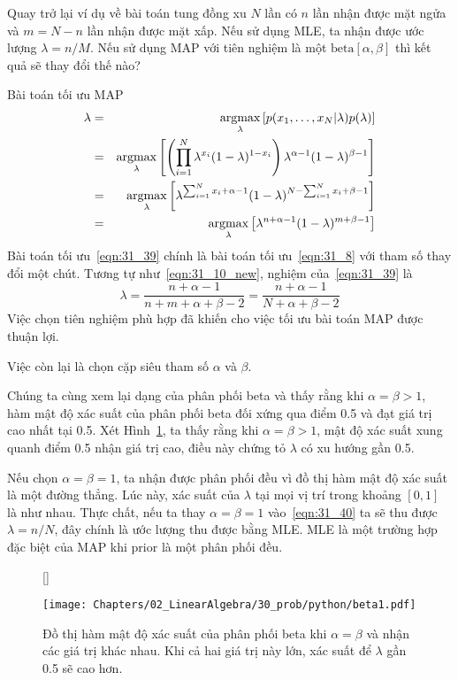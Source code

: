 Quay trở lại ví dụ về bài toán tung đồng xu $N$ lần có $n$ lần nhận được mặt
ngửa và $m = N - n$ lần nhận được mặt xấp. Nếu sử dụng MLE,
ta nhận được ước lượng $\lambda = n/M$. Nếu sử dụng MAP với tiên nghiệm là một
$\text{beta}[\alpha, \beta]$ thì kết quả sẽ thay đổi thế nào?

Bài toán tối ưu MAP
\begin{eqnarray}
\nonumber
\lambda & = & \operatorname*{argmax}_{\lambda} \left[p(x_1, \dots, x_N | \lambda) p(\lambda) \right] \\\
\nonumber
& = & \operatorname*{argmax}_{\lambda} \left[\left(\prod_{i=1}^N \lambda^{x_i} ( 1- \lambda)^{1 - x_i}\right) \lambda^{\alpha - 1} ( 1 - \lambda)^{\beta - 1} \right] \\\
\nonumber
& = & \operatorname*{argmax}_{\lambda} \left[ \lambda^{\sum_{i = 1}^N x_i + \alpha - 1} ( 1- \lambda)^{N - \sum_{i=1}^N x_i + \beta - 1} \right] \\\
\label{eqn:31_39}
& = & \operatorname*{argmax}_{\lambda} \left[ \lambda^{n + \alpha - 1} ( 1- \lambda)^{m + \beta - 1} \right]
\end{eqnarray}
Bài toán tối ưu~\eqref{eqn:31_39} chính là bài toán tối ưu~\eqref{eqn:31_8} với
tham số thay đổi một chút. Tương tự như~\eqref{eqn:31_10_new}, nghiệm
của~\eqref{eqn:31_39} là
\begin{equation}
\label{eqn:31_40}
\lambda = \frac{n + \alpha - 1}{n + m + \alpha + \beta - 2}= \frac{n + \alpha - 1}{N + \alpha + \beta - 2}
\end{equation}
Việc chọn tiên nghiệm phù hợp đã khiến cho việc tối ưu bài toán MAP được thuận
lợi.


Việc còn lại là chọn cặp siêu tham số $\alpha$ và $\beta$.

Chúng ta cùng xem lại dạng của phân phối beta và thấy rằng khi $\alpha
= \beta > 1$, hàm mật độ xác suất của phân phối beta đối xứng qua điểm 0.5 và
đạt giá trị cao nhất tại 0.5. Xét Hình~\ref{fig:31_1}, ta thấy rằng khi
$\alpha =\beta > 1$, mật độ xác suất xung quanh điểm 0.5 nhận giá trị
cao, điều này chứng tỏ $\lambda$ có xu hướng gần 0.5.

Nếu chọn $\alpha = \beta = 1$, ta nhận được phân phối đều vì đồ thị hàm mật
độ xác suất là một đường thẳng. Lúc này, xác suất của $\lambda$ tại mọi vị trí
trong khoảng $[0, 1]$ là như nhau. Thực chất, nếu ta thay $\alpha = \beta = 1$
vào~\eqref{eqn:31_40} ta sẽ thu được $\lambda = n/N$, đây chính là ước lượng thu
được bằng MLE. MLE là một trường hợp đặc biệt của MAP khi prior là một phân phối
đều.

\begin{figure}[t]
[\FBwidth]
{\caption{ Đồ thị hàm mật độ xác suất của phân phối beta khi $\alpha =
\beta$ và nhận các giá trị khác nhau. Khi cả hai giá trị này lớn, xác suất
để $\lambda$ gần 0.5 sẽ cao hơn. }
\label{fig:31_1}}
{ %
\texttt{[image: Chapters/02\_LinearAlgebra/30\_prob/python/beta1.pdf]}
}
\end{figure}


